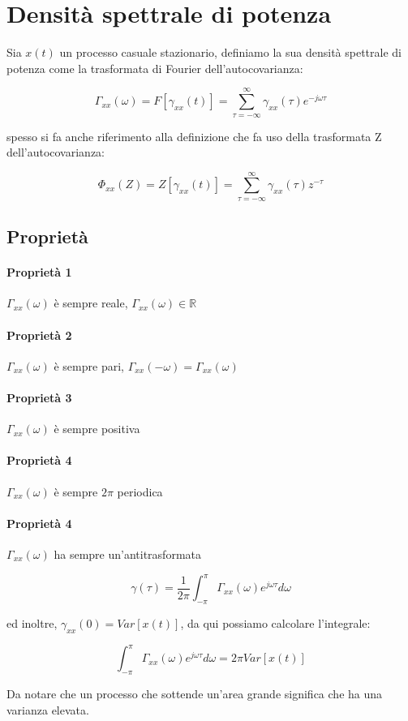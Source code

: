 \section{Densità spettrale di potenza}
Sia $x(t)$ un processo casuale stazionario, definiamo la sua densità spettrale di potenza come la trasformata di Fourier dell'autocovarianza:

  \[ \Gamma_{xx}(\omega)=F[\gamma_{xx}(t)]=\sum_{\tau=-\infty}^{\infty}{\gamma_{xx}(\tau)e^{-j\omega\tau}} \]
  
\noindent spesso si fa anche riferimento alla definizione che fa uso della trasformata Z dell'autocovarianza:

  \[ \Phi_{xx}(Z)=Z[\gamma_{xx}(t)]= \sum_{\tau=-\infty}^{\infty}{\gamma_{xx}(\tau)z^{-\tau}} \]
  
\subsection{Proprietà}
\paragraph{Proprietà 1} $\Gamma_{xx}(\omega)$ è sempre reale, $\Gamma_{xx}(\omega) \in \mathbb{R} $
\paragraph{Proprietà 2} $\Gamma_{xx}(\omega)$ è sempre pari, $\Gamma_{xx}(-\omega)=\Gamma_{xx}(\omega)$
\paragraph{Proprietà 3} $\Gamma_{xx}(\omega)$ è sempre positiva
\paragraph{Proprietà 4} $\Gamma_{xx}(\omega)$ è sempre $2\pi$ periodica
\paragraph{Proprietà 4} $\Gamma_{xx}(\omega)$ ha sempre un'antitrasformata

  \[ \gamma(\tau)=\frac{1}{2\pi}\int_{-\pi}^{\pi}{\Gamma_{xx}(\omega)e^{j\omega\tau}d\omega} \]
  
ed inoltre, $\gamma_{xx}(0)=Var[x(t)]$, da qui possiamo calcolare l'integrale:

  \[  \int_{-\pi}^{\pi}{\Gamma_{xx}(\omega)e^{j\omega\tau}d\omega} = 2\pi Var[x(t)]\]
  
Da notare che un processo che sottende un'area grande significa che ha una varianza elevata.
